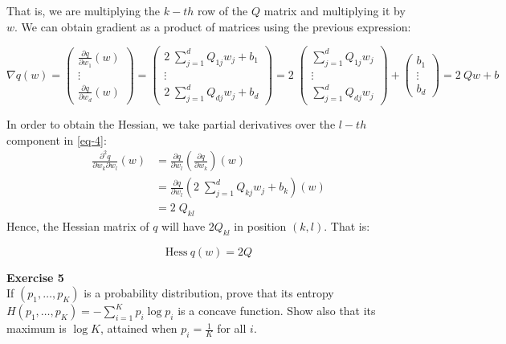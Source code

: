 \documentclass[11pt,table]{article}
\newenvironment{problem}[2][Exercise]
{ \begin{mdframed}[backgroundcolor=gray!20] \textbf{#1 #2} \\}
	{  \end{mdframed}}
\begin{document}
	That is, we are multiplying the \(k-th\) row of the \(Q\) matrix and multiplying it by \(w\). We can obtain gradient as a product of matrices using the previous expression:
	
	\[
	\nabla q(w) = \begin{pmatrix}
		\frac{\partial q}{\partial w_1} (w) \\
		\vdots                              \\
		\frac{\partial q}{\partial w_d} (w)
	\end{pmatrix}
	= \begin{pmatrix}
		2 \; \sum_{j=1}^{d} Q_{1j} w_{j} + b_{1} \\
		\vdots                                   \\
		2 \; \sum_{j=1}^{d} Q_{dj} w_{j} + b_{d}
	\end{pmatrix}
	= 2 \; \begin{pmatrix}
		\sum_{j=1}^{d} Q_{1j} w_{j} \\
		\vdots                      \\
		\sum_{j=1}^{d} Q_{dj} w_{j}
	\end{pmatrix} + \begin{pmatrix}
		b_{1}  \\
		\vdots \\
		b_{d}
	\end{pmatrix}
	= 2 \ Qw + b
	\]
	
	In order to obtain the Hessian, we take partial derivatives over the \(l-th\) component in \ref{eq-4}:
	\begin{align*}
		\frac{\partial^2 q}{\partial w_k \partial w_l} (w) & = \frac{\partial q}{\partial w_l} \left( \frac{\partial q}{\partial w_k} \right) (w)          \\
		& = \frac{\partial q}{\partial w_l} \left( 2 \; \sum_{j=1}^{d} Q_{kj} w_{j} + b_{k} \right) (w) \\
		& = 2 \; Q_{kl}
	\end{align*}
	Hence, the Hessian matrix of \(q\) will have \(2 Q_{kl}\) in position \((k, l)\). That is:
	
	\[
	\text{Hess} \ q(w) = 2Q
	\]
	
	\begin{problem}{5}
		If \( (p_1,\dots,p_K) \) is a probability distribution, prove that its entropy \( H(p_1, \dots, p_K) = - \sum_{i=1}^K p_i \log p_i\) is a concave function. Show also that its maximum is \( \log K \), attained when \( p_i = \frac{1}{K}\) for all $i$.
	\end{problem}
	
\end{document}
